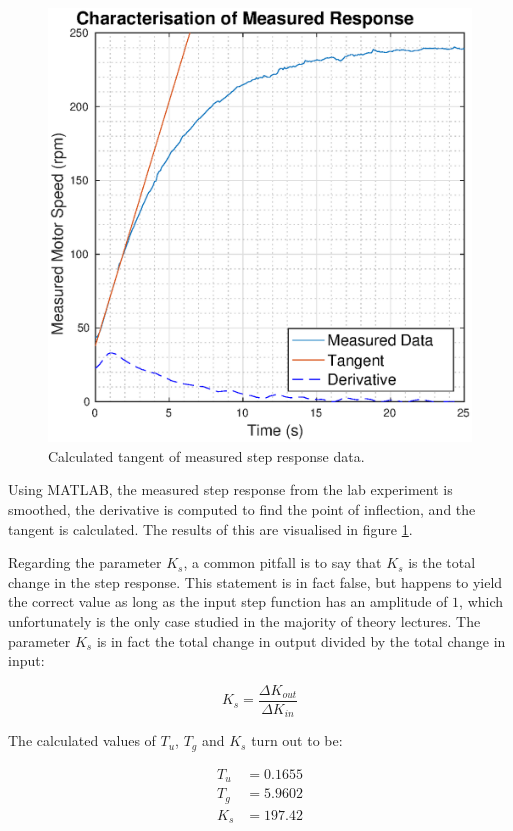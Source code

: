 \begin{figure}[t]
    \centering
    \includegraphics[width=\imagewidth]{images/characterisation}
    \caption{Calculated tangent of measured step response data.}
    \label{fig:characterisation}
\end{figure}

Using  MATLAB, the measured step response from the lab experiment is smoothed,
the derivative is computed to find the point of inflection, and the tangent is
calculated.   The    results    of    this    are    visualised    in   figure
\ref{fig:characterisation}.

Regarding the parameter $K_s$, a common pitfall is to  say  that  $K_s$ is the
total  change in the step response. This  statement  is  in  fact  false,  but
happens to yield the correct value as long as the input step  function  has an
amplitude of $1$, which unfortunately is the only case studied in the majority
of theory lectures. The parameter $K_s$ is in fact the total change in  output
divided by the total change in input:

\begin{equation}
    K_s = \frac{\Delta K_{out}}{\Delta K_{in}}
\end{equation}

The calculated values of $T_u$, $T_g$ and $K_s$ turn out to be:

\begin{align*}
    T_u &= 0.1655 \\
    T_g &= 5.9602 \\
    K_s &= 197.42
\end{align*}

